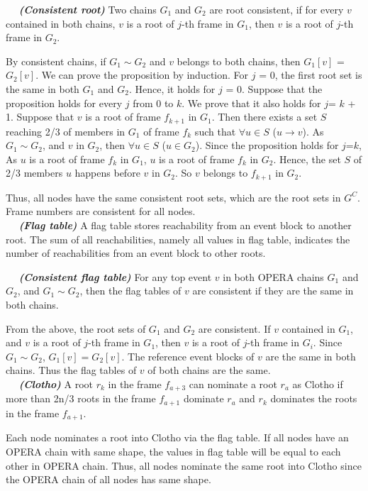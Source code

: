 \documentclass{article}
\newcommand{\dfnn}[2]{$\quad$ \textbf{\emph{(#1)}} {#2}}
\newcommand{\hbefore}{\rightarrow}
\begin{document}
\dfnn{Consistent root}{Two chains $G_1$ and $G_2$ are root consistent, if for every $v$ contained in both chains, $v$ is a root of $j$-th frame in $G_1$, then $v$ is a root of $j$-th frame in $G_2$.}

By consistent chains, if $G_1 \sim G_2$ and $v$ belongs to both chains, then $G_1[v]$ = $G_2[v]$.
We can prove the proposition by induction. For $j$ = 0, the first root set is the same in both $G_1$ and $G_2$. Hence, it holds for $j$ = 0. Suppose that the proposition holds for every $j$ from 0 to $k$. We prove that it also holds for $j$= $k$ + 1.
Suppose that $v$ is a root of frame $f_{k+1}$ in $G_1$. 
Then there exists a set $S$ reaching 2/3 of members in $G_1$ of frame $f_k$ such that $\forall u \in S$ ($u\hbefore v$). As $G_1 \sim G_2$, and $v$ in $G_2$, then $\forall u \in S$ ($u \in G_2$). Since the proposition holds for $j$=$k$, 
As $u$ is a root of frame $f_{k}$ in $G_1$, $u$ is a root of frame $f_k$ in $G_2$. Hence, the set $S$ of 2/3 members $u$ happens before $v$ in $G_2$. So $v$ belongs to $f_{k+1}$ in $G_2$.
	
Thus, all nodes have the same consistent root sets, which are the root sets in $G^C$. Frame numbers are consistent for all nodes.\\

\dfnn{Flag table}{A flag table stores reachability from an event block to another root. The sum of all reachabilities, namely all values in flag table, indicates the number of reachabilities from an event block to other roots.}

\dfnn{Consistent flag table}{For any top event $v$ in both OPERA chains $G_1$ and $G_2$, and $G_1 \sim G_2$, then the flag tables of $v$ are consistent if they are the same in both chains.}

From the above, the root sets of $G_1$ and $G_2$ are consistent. If $v$ contained in $G_1$, and $v$ is a root of $j$-th frame in $G_1$, then $v$ is a root of $j$-th frame in $G_i$. Since $G_1 \sim G_2$, $G_1[v] = G_2[v]$. The reference event blocks of $v$ are the same in both chains. Thus the flag tables of $v$ of both chains are the same.\\

\dfnn{Clotho}{A root $r_k$ in the frame $f_{a+3}$ can nominate a root $r_a$ as Clotho if more than 2n/3 roots in the frame $f_{a+1}$ dominate $r_a$ and $r_k$ dominates the roots in the frame $f_{a+1}$.}

Each node nominates a root into Clotho via the flag table. If all nodes have an OPERA chain with same shape, the values in flag table will be equal to each other in OPERA chain. Thus, all nodes nominate the same root into Clotho since the OPERA chain of all nodes has same shape.
\end{document}
